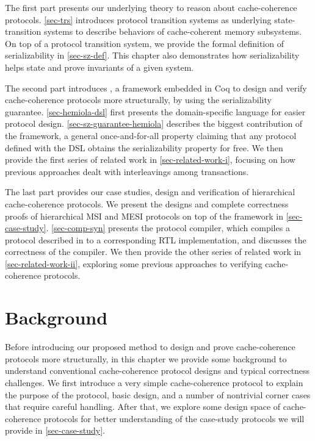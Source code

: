 The first part presents our underlying theory to reason about cache-coherence protocols.
\autoref{sec-trs} introduces protocol transition systems as underlying state-transition systems to describe behaviors of cache-coherent memory subsystems.
On top of a protocol transition system, we provide the formal definition of serializability in \autoref{sec-sz-def}.
This chapter also demonstrates how serializability helps state and prove invariants of a given system.

The second part introduces \hemiola{}, a framework embedded in Coq to design and verify cache-coherence protocols more structurally, by using the serializability guarantee.
\autoref{sec-hemiola-dsl} first presents the \hemiola{} domain-specific language for easier protocol design.
\autoref{sec-sz-guarantee-hemiola} describes the biggest contribution of the framework, a general once-and-for-all property claiming that any protocol defined with the DSL obtains the serializability property for free.
We then provide the first series of related work in \autoref{sec-related-work-i}, focusing on how previous approaches dealt with interleavings among transactions.

The last part provides our case studies, design and verification of hierarchical cache-coherence protocols.
We present the designs and complete correctness proofs of hierarchical MSI and MESI protocols on top of the \hemiola{} framework in \autoref{sec-case-study}.
\autoref{sec-comp-syn} presents the protocol compiler, which compiles a protocol described in \hemiola{} to a corresponding RTL implementation, and discusses the correctness of the compiler.
We then provide the other series of related work in \autoref{sec-related-work-ii}, exploring some previous approaches to verifying cache-coherence protocols.

\chapter{Background}
\label{sec-background}

Before introducing our proposed method to design and prove cache-coherence protocols more structurally, in this chapter we provide some background to understand conventional cache-coherence protocol designs and typical correctness challenges.
We first introduce a very simple cache-coherence protocol to explain the purpose of the protocol, basic design, and a number of nontrivial corner cases that require careful handling.
After that, we explore some design space of cache-coherence protocols for better understanding of the case-study protocols we will provide in \autoref{sec-case-study}.

